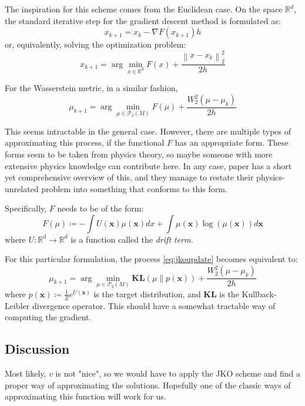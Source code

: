 \documentclass{article}
\newcommand{\norm}[1]{\left\lVert#1\right\rVert}
\begin{document}
The inspiration for this scheme comes from the Euclidean case. On the 
space $\mathbb{R}^d$, the standard iterative step for the gradient 
descent method is formulated as:
\[x_{k+1} = x_k - \nabla F(x_{k+1})h \]
or, equivalently, solving the optimization problem:
\[x_{k+1} = \arg\min_{x\in \mathbb{R}^d} F(x)+ \frac{\norm{x - x_k}_2^2}{2h} \]

For the Wasserstein metric, in a similar fashion, 
\begin{equation}
    \label{eq:jkoupdate}
    \mu_{k+1} = \arg\min_{\mu\in\mathscr{P}_2(M)} F(\mu)+ \frac{W_2^2(\mu - \mu_k)}{2h}
\end{equation}

This seems intractable in the general case. However, there are multiple
types of approximating this process, if the functional $F$ has an appropriate 
form. These forms seem to be taken from physics theory, so maybe someone 
with more extensive physics knowledge can contribute here. In any case,
paper \cite{zhang2018policy} has a short yet comprehensive overview of this,
and they manage to restate their physics-unrelated problem into something 
that conforms to this form.

Specifically, $F$ needs to be of the form:
\[F(\mu)\coloneqq -\int U(\mathbf{x})\mu(\mathbf{x})dx + \int
\mu(\mathbf{x})\log(\mu(\mathbf{x}))d\mathbf{x} \]
where $U:\mathbb{R}^d\rightarrow \mathbb{R}^d$ is a function called the 
\textit{drift term.}

For this particular formulation, the process \ref{eq:jkoupdate} becomes 
equivalent to:
\[\mu_{k+1} = \arg\min_{\mu\in\mathscr{P}_2(M)} \mathbf{KL}(\mu\parallel p(\mathbf{x}))+ \frac{W_2^2(\mu - \mu_k)}{2h} \]
where $p(\mathbf{x})\coloneqq \frac{1}{Z}e^{U(\mathbf{x})}$ is the target 
distribution, and $\mathbf{KL}$ is the Kullback-Leibler divergence operator.
This should have a somewhat tractable way of computing the gradient.

\subsection{Discussion}

Most likely, $v$ is not "nice", so we would have to apply the JKO scheme
and find a proper way of approximating the solutions. Hopefully one of 
the classic ways of approximating this function will work for us.



\end{document}
